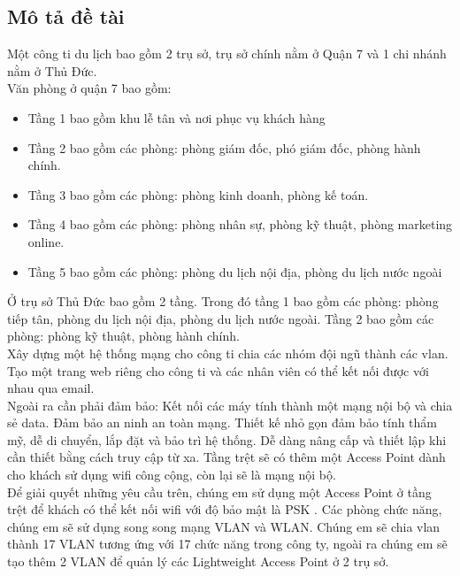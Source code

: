 \documentclass[a4paper, 12pt]{article}
\begin{document}
\subsection{Mô tả đề tài}
\hspace*{0.25cm}Một công ti du lịch bao gồm 2 trụ sở, trụ sở chính nằm ở Quận 7 và 1 chi nhánh nằm ở Thủ Đức.  \\
\hspace*{1cm}Văn phòng ở quận 7 bao gồm:
\begin{itemize}
\item Tầng 1 bao gồm khu lễ tân và nơi phục vụ khách hàng
\item Tầng 2 bao gồm các phòng: phòng giám đốc, phó giám đốc, phòng hành chính.
 \item Tầng 3 bao gồm các phòng: phòng kinh doanh, phòng kế toán. 
\item Tầng 4 bao gồm các phòng: phòng nhân sự, phòng kỹ thuật, phòng marketing online.
\item Tầng 5 bao gồm các phòng: phòng du lịch nội địa, phòng du lịch nước ngoài
\end{itemize}
\hspace*{1cm}Ở trụ sở Thủ Đức bao gồm 2 tầng. Trong đó tầng 1 bao gồm các phòng: phòng tiếp tân, phòng du lịch nội địa, phòng du lịch nước ngoài. Tầng 2 bao gồm các phòng: phòng kỹ thuật, phòng hành chính.\\
\hspace*{1cm}Xây dựng một hệ thống mạng cho công ti chia các nhóm đội ngũ thành các vlan. Tạo một trang web riêng cho công ti và các nhân viên có thể kết nối được với nhau qua email.\\
\hspace*{1cm}Ngoài ra cần phải đảm bảo: Kết nối các máy tính thành một mạng nội bộ và chia sẻ data. Đảm bảo an ninh an toàn mạng. Thiết kế nhỏ gọn đảm bảo tính thẩm mỹ, dễ di chuyển, lắp đặt và bảo trì hệ thống. Dễ dàng nâng cấp và thiết lập khi cần thiết bằng cách truy cập từ xa. Tầng trệt sẽ có thêm một Access Point dành cho khách sử dụng wifi công cộng,  còn lại sẽ là mạng nội bộ. \\
\hspace*{1cm} Để giải quyết những yêu cầu trên, chúng em sử dụng một Access Point ở tầng trệt để khách có thể kết nối wifi với độ bảo mật là PSK . Các phòng chức năng, chúng em sẽ sử dụng song song mạng VLAN và WLAN. Chúng em sẽ chia vlan thành 17 VLAN tương ứng với 17 chức năng trong công ty, ngoài ra chúng em sẽ tạo thêm 2 VLAN để quản lý các Lightweight Access Point ở 2 trụ sở. \\
\end{document}
